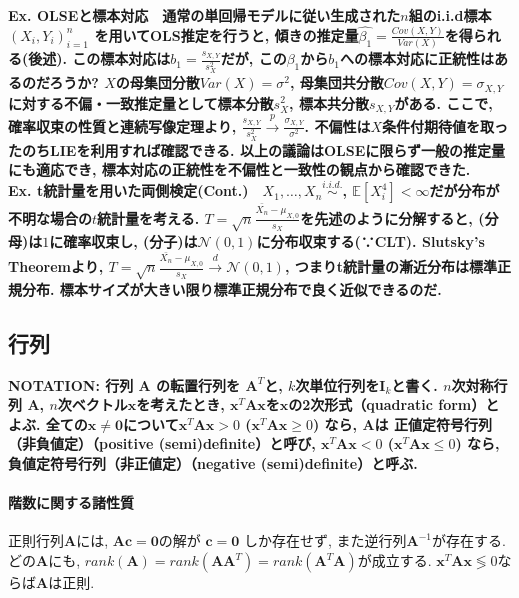 \documentclass[paper=a4paper,fontsize=10pt]{jlreq}
\begin{document}
\rmfamily\mcfamily\bfseries{Ex. OLSEと標本対応}\mdseries　通常の単回帰モデルに従い生成された$n$組のi.i.d標本$(X_i, Y_i)_{i=1}^{n}$ を用いてOLS推定を行うと, 傾きの推定量$\hat{\beta_1}=\frac{Cov(X,Y)}{Var(X)}$を得られる(後述). この\rmfamily\mcfamily\bfseries{標本対応}\mdseries は$b_1=\frac{s_{X,Y}}{s^{2}_{X}}$だが, この$\beta_1$から$b_1$への標本対応に正統性はあるのだろうか? $X$の母集団分散$Var(X)=\sigma^2$, 母集団共分散$Cov(X,Y)=\sigma_{X,Y}$ に対する不偏・一致推定量として標本分散$s^2_X$, 標本共分散$s_{X,Y}$がある. ここで, 確率収束の性質と連続写像定理より, $\frac{s_{X,Y}}{s^{2}_{X}} \overset{p}{\to} \frac{\sigma_{X,Y}}{\sigma^2}$. 不偏性は$X$条件付期待値を取ったのちLIEを利用すれば確認できる. 以上の議論はOLSEに限らず一般の推定量にも適応でき, 標本対応の正統性を不偏性と一致性の観点から確認できた.\\

\rmfamily\mcfamily\bfseries{Ex. t統計量を用いた両側検定(Cont.)}\mdseries　$X_1, \dots, X_n \overset{i.i.d.}{\sim}$, $\mathbb{E}[X_i^4]<\infty$だが分布が不明な場合の$t$統計量を考える. $T=\sqrt{n} \frac{\bar{X_n}-\mu_{X,0}}{s_X}$を先述のように分解すると, (分母)は$1$に確率収束し, (分子)は$\mathcal{N}(0,1)$に分布収束する(∵CLT). Slutsky's Theoremより, $T=\sqrt{n} \frac{\bar{X_n}-\mu_{X,0}}{s_X} \overset{d}{\to} \mathcal{N}(0, 1)$, つまり\rmfamily\mcfamily\bfseries{t統計量の漸近分布は標準正規分布}\mdseries . 標本サイズが大きい限り標準正規分布で良く近似できるのだ.\\

\subsection{行列}
\rmfamily\mcfamily\bfseries{NOTATION}\mdseries : 行列 $\mathbf{A}$ の転置行列を $\mathbf{A}^{T}$と, $k$次単位行列を$\mathbf{I}_k$と書く. $n$次対称行列 $\mathbf{A}$, $n$次ベクトル$\mathbf{x}$を考えたとき, $\mathbf{x}^T\mathbf{A}\mathbf{x}$を$\mathbf{x}$の\rmfamily\mcfamily\bfseries{2次形式（quadratic form）}\mdseries とよぶ. 全ての$\mathbf{x} \neq  \mathbf{0}$について$\mathbf{x}^T\mathbf{A}\mathbf{x}>0$ ($\mathbf{x}^T\mathbf{A}\mathbf{x}\geq 0$) なら, $\mathbf{A}$は \rmfamily\mcfamily\bfseries{正値定符号行列（非負値定）（positive (semi)definite）}\mdseries と呼び,  $\mathbf{x}^T\mathbf{A}\mathbf{x}<0$ ($\mathbf{x}^T\mathbf{A}\mathbf{x}\leq0$) なら, \rmfamily\mcfamily\bfseries{負値定符号行列（非正値定）（negative (semi)definite）}\mdseries と呼ぶ. \\

\paragraph{階数に関する諸性質}
正則行列$\mathbf{A}$には, $\mathbf{A}\mathbf{c}=\mathbf{0}$の解が $\mathbf{c}=\mathbf{0}$ しか存在せず, また逆行列$\mathbf{A}^{-1}$が存在する. どの$\mathbf{A}$にも, $rank(\mathbf{A})=rank(\mathbf{A}\mathbf{A}^T)=rank(\mathbf{A}^T\mathbf{A})$が成立する. $\mathbf{x}^T\mathbf{A}\mathbf{x}\lessgtr0$ならば$\mathbf{A}$は正則.\\
\end{document}
